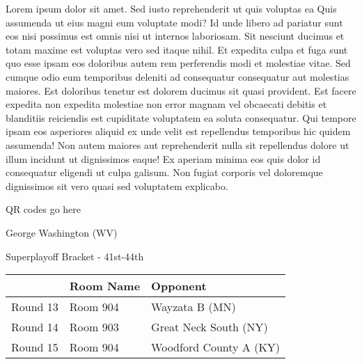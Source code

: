 \documentclass{article}%
\begin{document}
\vspace*{8pt}%
\linebreak%
\newline%
\newline%
Lorem ipsum dolor sit amet. Sed iusto reprehenderit ut quis voluptas ea Quis assumenda ut eius magni eum voluptate modi? Id unde libero ad pariatur sunt eos nisi possimus est omnis nisi ut internos laboriosam. Sit nesciunt ducimus et totam maxime est voluptas vero sed itaque nihil. Et expedita culpa et fuga sunt quo esse ipsam eos doloribus autem rem perferendis modi et molestiae vitae.\newline%
\newline%
Sed cumque odio eum temporibus deleniti ad consequatur consequatur aut molestias maiores. Est doloribus tenetur est dolorem ducimus sit quasi provident. Est facere expedita non expedita molestiae non error magnam vel obcaecati debitis et blanditiis reiciendis est cupiditate voluptatem ea soluta consequatur. Qui tempore ipsam eos asperiores aliquid ex unde velit est repellendus temporibus hic quidem assumenda!\newline%
\newline%
Non autem maiores aut reprehenderit nulla sit repellendus dolore ut illum incidunt ut dignissimos eaque! Ex aperiam minima eos quis dolor id consequatur eligendi ut culpa galisum. Non fugiat corporis vel doloremque dignissimos sit vero quasi sed voluptatem explicabo.\newline%
\newline%
%
\vspace*{30pt}%
\begin{center}%
\begin{Huge}%
QR codes go here%
\end{Huge}%
\end{center}%
\newpage%
\begin{center}%
\begin{Huge}%
George Washington (WV)%
\end{Huge}%
\vspace*{8pt}%
\linebreak%
\begin{Large}%
Superplayoff Bracket {-} 41st{-}44th%
\end{Large}%
\end{center}%
%
\begin{tabularx}{\textwidth}{|c|Y|Y|}%
\hline%
&Room Name&Opponent\\%
\hline%
Round 13&Room 904&Wayzata B (MN)\\%
Round 14&Room 903&Great Neck South (NY)\\%
Round 15&Room 904&Woodford County A (KY)\\%
\hline%
\end{tabularx}%
\end{document}
